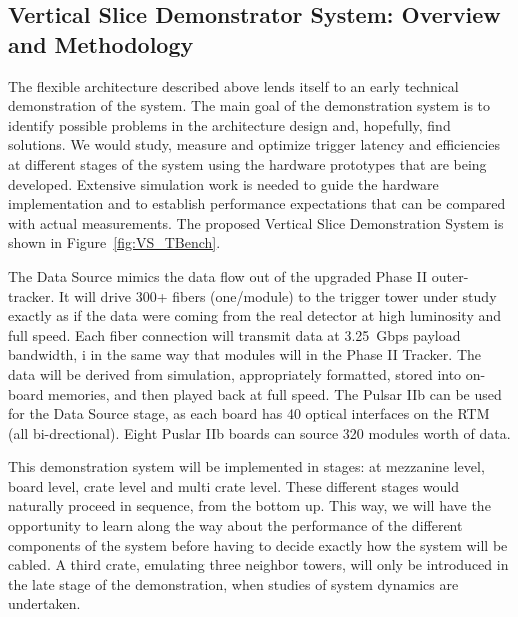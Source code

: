 \subsection{Vertical Slice Demonstrator System: Overview and Methodology}

\noindent The flexible architecture described above lends itself to an early technical demonstration of the system. The main goal of the demonstration system is to identify possible problems in the architecture design and, hopefully, find solutions. We would study, measure and optimize trigger latency and efficiencies at different stages of the system using the hardware prototypes that are being developed. 
Extensive simulation work is needed to guide the hardware implementation and to establish performance expectations that can be compared with actual measurements. The proposed Vertical Slice Demonstration System is shown in Figure~\ref{fig:VS_TBench}. 

\noindent The Data Source mimics the data flow out of the upgraded Phase II outer-tracker. It will drive 300+ fibers (one/module) to the trigger tower under study exactly as if the data were coming from the real detector at high luminosity and full speed. Each fiber connection will transmit data at 3.25~Gbps payload bandwidth, i
in the same way that modules will in the Phase II Tracker. The data will be derived from simulation, appropriately formatted, stored into on-board memories, and then played back at full speed.  
The Pulsar IIb can be used for the Data Source stage, as each board has 40 optical interfaces on the RTM (all bi-drectional). Eight Puslar IIb boards can source 320 modules worth of data.


This demonstration system will be implemented in stages: at mezzanine level, board level, crate level and multi crate level. These different stages would naturally proceed in sequence, from the bottom up. This way, we will have the opportunity to learn along the way about the performance of the different components of the system before having to decide exactly how the system will be cabled. A third crate, emulating three neighbor towers, will only be introduced in the late stage of the demonstration, when studies of system dynamics are undertaken. 

